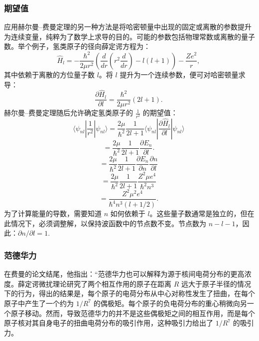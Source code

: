 \subsubsection{期望值}
应用赫尔曼–费曼定理的另一种方法是将哈密顿量中出现的固定或离散的参数提升为连续变量，纯粹为了数学上求导的目的。可能的参数包括物理常数或离散的量子数。举个例子，氢类原子的径向薛定谔方程为：
\[
\hat{H}_l = - \frac{\hbar^2}{2\mu r^2} \left( \frac{d}{dr} \left( r^2 \frac{d}{dr} \right) - l(l+1) \right) - \frac{Ze^2}{r},~
\]
其中依赖于离散的方位量子数 \(l\)。将 \(l\) 提升为一个连续参数，便可对哈密顿量求导：
\[
\frac{\partial \hat{H}_l}{\partial l} = \frac{\hbar^2}{2\mu r^2}(2l+1).~
\]
赫尔曼–费曼定理随后允许确定氢类原子的 \(\frac{1}{r^2}\) 的期望值：
\[
\langle \psi_{nl} \left| \frac{1}{r^2} \right| \psi_{nl} \rangle = \frac{2\mu}{\hbar^2} \frac{1}{2l+1} \langle \psi_{nl} \left| \frac{\partial \hat{H}_l}{\partial l} \right| \psi_{nl} \rangle ~
\]
\[=\frac{2\mu}{\hbar^2} \frac{1}{2l+1} \frac{\partial E_n}{\partial l}.~\]
\[
= \frac{2\mu}{\hbar^2} \frac{1}{2l+1} \frac{\partial E_n}{\partial n} \frac{\partial n}{\partial l}~
\]
\[
= \frac{2\mu}{\hbar^2} \frac{1}{2l+1} \frac{Z^2 \mu e^4}{\hbar^2 n^3}~
\]
\[
= \frac{Z^2 \mu^2 e^4}{\hbar^4 n^3 (l + 1/2)}.~
\]
为了计算能量的导数，需要知道 \(n\) 如何依赖于 \(l\)。这些量子数通常是独立的，但在此情况下，必须调整解，以保持波函数中的节点数不变。节点数为 \(n - l - 1\)，因此：\(\partial n/\partial l = 1.\)
\subsubsection{范德华力}
在费曼的论文结尾，他指出：“范德华力也可以解释为源于核间电荷分布的更高浓度。薛定谔微扰理论研究了两个相互作用的原子在距离 \(R\) 远大于原子半径的情况下的行为，得出的结果是，每个原子的电荷分布从中心对称性发生了扭曲，在每个原子中产生了一个约为 \(1/R^7\) 的偶极矩。每个原子的负电荷分布的重心稍微向另一个原子移动。然而，导致范德华力的并不是这些偶极矩之间的相互作用，而是每个原子核对其自身电子的扭曲电荷分布的吸引作用，这种吸引力给出了 \(1/R^7\) 的吸引力。